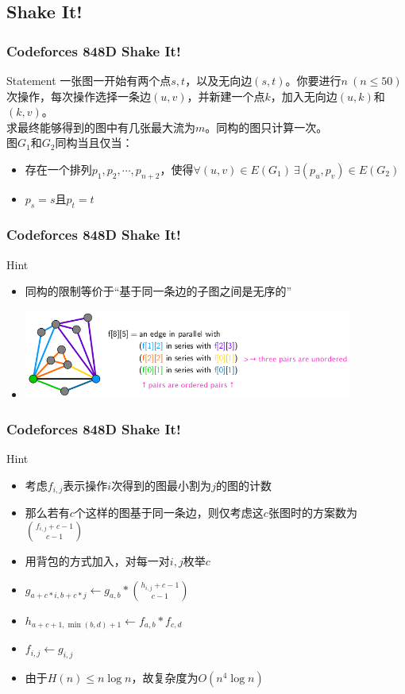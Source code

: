 \documentclass{beamer}
\begin{document}
\subsection{Shake It!}
\begin{frame}
  \frametitle{Codeforces 848D Shake It!}
  \begin{block}{Statement}
    \setlength{\parindent}{2em}
    一张图一开始有两个点$s,t$，以及无向边$(s,t)$。你要进行$n\ (n\le 50)$次操作，每次操作选择一条边$(u,v)$，并新建一个点$k$，加入无向边$(u,k)$和$(k,v)$。\\
    求最终能够得到的图中有几张最大流为$m$。同构的图只计算一次。\\
    图$G_1$和$G_2$同构当且仅当：
    \begin{itemize}
    \item 存在一个排列$p_1,p_2,\cdots,p_{n+2}$，使得$\forall (u,v)\in E(G_1)\ \exists (p_u,p_v)\in E(G_2)$
    \item $p_s=s$且$p_t=t$
    \end{itemize}
  \end{block}
\end{frame}


\begin{frame}
  \frametitle{Codeforces 848D Shake It!}
  \begin{block}{Hint}
    \begin{itemize}
    \item 同构的限制等价于“基于同一条边的子图之间是无序的” \pause
    \item \includegraphics[width=0.85\textwidth]{flow.png}
    \end{itemize}
  \end{block}
\end{frame}

\begin{frame}
  \frametitle{Codeforces 848D Shake It!}
  \begin{block}{Hint}
    \begin{itemize}
    \item 考虑$f_{i,j}$表示操作$i$次得到的图最小割为$j$的图的计数 \pause
    \item 那么若有$c$个这样的图基于同一条边，则仅考虑这$c$张图时的方案数为$\binom{f_{i,j}+c-1}{c-1}$ \pause
    \item 用背包的方式加入，对每一对$i,j$枚举$c$ \pause
    \item $g_{a+c*i,b+c*j} \leftarrow g_{a,b}*\binom{h_{i,j}+c-1}{c-1}$
    \item $h_{a+c+1,\min(b,d)+1}\leftarrow f_{a,b}*f_{c,d}$
    \item $f_{i,j}\leftarrow g_{i,j}$\pause
    \item 由于$H(n)\le n\log n$，故复杂度为$O(n^4\log n)$
    \end{itemize}    
  \end{block}
\end{frame}
\end{document}
